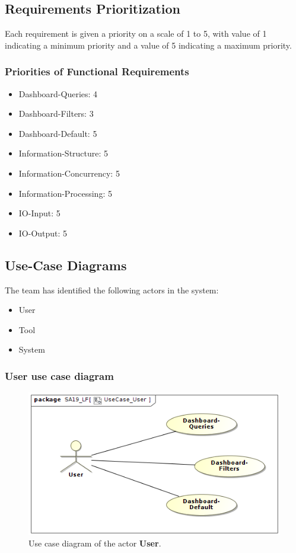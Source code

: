 \subsection{Requirements Prioritization}
Each requirement is given a priority on a scale of 1 to 5, with value of 1 indicating a minimum priority and a value of 5 indicating a maximum priority.\\
\subsubsection{Priorities of Functional Requirements}
\begin{itemize}[nosep]
    \item Dashboard-Queries: 4
    \item Dashboard-Filters: 3
    \item Dashboard-Default: 5
    \item Information-Structure: 5
    \item Information-Concurrency: 5
    \item Information-Processing: 5
    \item IO-Input: 5
    \item IO-Output: 5
\end{itemize}
\newpage
\subsection{Use-Case Diagrams}
The team has identified the following actors in the system:
\begin{itemize}
    \item User
    \item Tool
    \item System
\end{itemize}

\subsubsection{User use case diagram}
\begin{figure}[H]
\centering
\includegraphics[width=\textwidth]{img/UseCase_User.png}
\caption{Use case diagram of the actor \textbf{User}.}
\end{figure}

